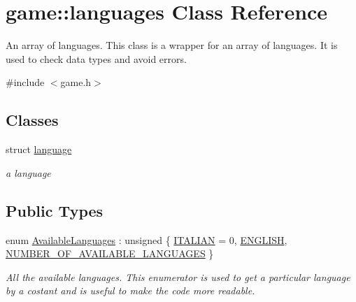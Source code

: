 \hypertarget{classgame_1_1languages}{}\section{game\+::languages Class Reference}
\label{classgame_1_1languages}


An array of languages. This class is a wrapper for an array of languages. It is used to check data types and avoid errors.  




{\ttfamily \#include $<$game.\+h$>$}

\subsection*{Classes}
\begin{DoxyCompactItemize}
\item 
struct \mbox{\hyperlink{structgame_1_1languages_1_1language}{language}}
\begin{DoxyCompactList}\small\item\em a language \end{DoxyCompactList}\end{DoxyCompactItemize}
\subsection*{Public Types}
\begin{DoxyCompactItemize}
\item 
enum \mbox{\hyperlink{classgame_1_1languages_ad965ce3a9fdce02ab3caba6301f221eb}{Available\+Languages}} \+: unsigned \{ \mbox{\hyperlink{classgame_1_1languages_ad965ce3a9fdce02ab3caba6301f221eba6a9c4d893a8d2d6137b6c7cff199273b}{I\+T\+A\+L\+I\+AN}} = 0, 
\mbox{\hyperlink{classgame_1_1languages_ad965ce3a9fdce02ab3caba6301f221ebab655e8c91a47f2e3eb4e17e5d942ffe2}{E\+N\+G\+L\+I\+SH}}, 
\mbox{\hyperlink{classgame_1_1languages_ad965ce3a9fdce02ab3caba6301f221ebaf567120d543efe0ddf915638e32eeda2}{N\+U\+M\+B\+E\+R\+\_\+\+O\+F\+\_\+\+A\+V\+A\+I\+L\+A\+B\+L\+E\+\_\+\+L\+A\+N\+G\+U\+A\+G\+ES}}
 \}
\begin{DoxyCompactList}\small\item\em All the available languages. This enumerator is used to get a particular language by a costant and is useful to make the code more readable. \end{DoxyCompactList}\end{DoxyCompactItemize}
